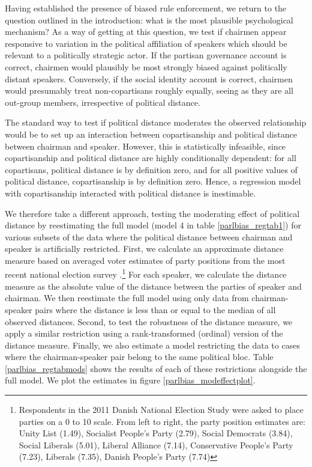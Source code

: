 \documentclass[12pt,a4paper]{article}
\begin{document}
Having established the presence of biased rule enforcement, we return to the question outlined in the introduction: what is the most plausible psychological mechanism? As a way of getting at this question, we test if chairmen appear responsive to variation in the political affiliation of speakers which should be relevant to a politically strategic actor. If the partisan governance account is correct, chairmen would plausibly be most strongly biased against politically distant speakers. Conversely, if the social identity account is correct, chairmen would presumably treat non-copartisans roughly equally, seeing as they are all out-group members, irrespective of political distance. 

The standard way to test if political distance moderates the observed relationship would be to set up an interaction between copartisanship and political distance between chairman and speaker. However, this is statistically infeasible, since copartisanship and political distance are highly conditionally dependent: for all copartisans, political distance is by definition zero, and for all positive values of political distance, copartisanship is by definition zero. Hence, a regression model with copartisanship interacted with political distance is inestimable. 

We therefore take a different approach, testing the moderating effect of political distance by reestimating the full model (model 4 in table \ref{parlbias_regtab1}) for various subsets of the data where the political distance between chairman and speaker is artificially restricted.  First, we calculate an approximate distance measure based on averaged voter estimates of party positions from the most recent national election survey \citep{Stubager2013}.\footnote{Respondents in the 2011 Danish National Election Study were asked to place parties on a 0 to 10 scale. From left to right, the party position estimates are: Unity List (1.49), Socialist People's Party (2.79), Social Democrats (3.84), Social Liberals (5.01), Liberal Alliance (7.14), Conservative People's Party (7.23), Liberals (7.35), Danish People's Party (7.74)} For each speaker, we calculate the distance measure as the absolute value of the distance between the parties of speaker and chairman. We then reestimate the full model using only data from chairman-speaker pairs where the distance is less than or equal to the median of all observed distances. Second, to test the robustness of the distance measure, we apply a similar restriction using a rank-transformed (ordinal) version of the distance measure. Finally, we also estimate a model restricting the data to cases where the chairman-speaker pair belong to the same political bloc. Table \ref{parlbias_regtabmods} shows the results of each of these restrictions alongside the full model. We plot the estimates in figure \ref{parlbias_modeffectplot}.
\end{document}
